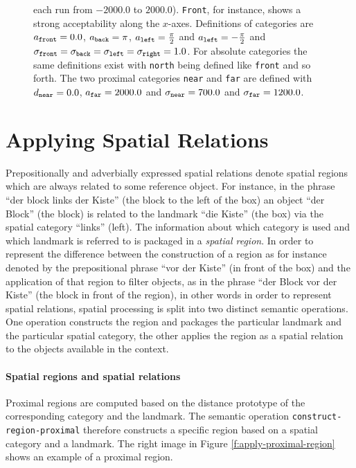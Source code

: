 \begin{figure}
{ each run from $-2000.0$ to $2000.0$). 
 {\footnotesize\tt Front}, for instance, shows a strong acceptability along the $x$-axes. Definitions of 
categories are $a_{\footnotesize\tt front}=0.0$, $a_{\footnotesize\tt back}=\pi$, 
$a_{\footnotesize\tt left}=\frac{\pi}{2}$ and $a_{\footnotesize\tt left}=-\frac{\pi}{2}$ and
$\sigma_{\footnotesize\tt front}=\sigma_{\footnotesize\tt back}=\sigma_{\footnotesize\tt left}=\sigma_{\footnotesize\tt right} = 1.0$.
For absolute categories the same definitions exist with {\footnotesize\tt north} being defined like {\footnotesize\tt front}
and so forth.
The two proximal categories {\footnotesize\tt near} and {\footnotesize\tt far} are defined 
with $d_{\footnotesize\tt near}=0.0$, $a_{\footnotesize\tt far}=2000.0$ and 
$\sigma_{\footnotesize\tt near}=700.0$ and $\sigma_{\footnotesize\tt far}=1200.0$.}
\end{figure}


\section{Applying Spatial Relations}
Prepositionally and adverbially expressed spatial relations denote 
spatial regions which are always related to some reference object.
For instance, in the phrase ``der block links der Kiste'' (the block to the left
of the box) an object ``der Block'' (the block) is related to the landmark 
``die Kiste'' (the box) via the spatial category ``links'' (left). 
The information about which category is used and which landmark
is referred to is packaged in a \emph{spatial region}.
In order to represent the difference between the construction of a region
as for instance denoted by the prepositional phrase ``vor der Kiste''
(in front of the box) and the application of that region to filter objects,
as in the phrase ``der Block vor der Kiste'' (the block in front of the region),
in other words in order to represent spatial relations, spatial 
processing is split into two distinct semantic operations. One operation
constructs the region and packages the particular landmark and the particular
spatial category, the other applies the region as a spatial relation 
to the objects available in the context.

\paragraph*{Spatial regions and spatial relations}
Proximal regions are computed based on the distance prototype of the 
corresponding category and the landmark. The semantic operation
{\footnotesize\tt construct-region-proximal} therefore constructs a specific 
region based on a spatial category and a landmark. 
The right image in Figure \ref{f:apply-proximal-region} 
shows an example of a proximal region. 



